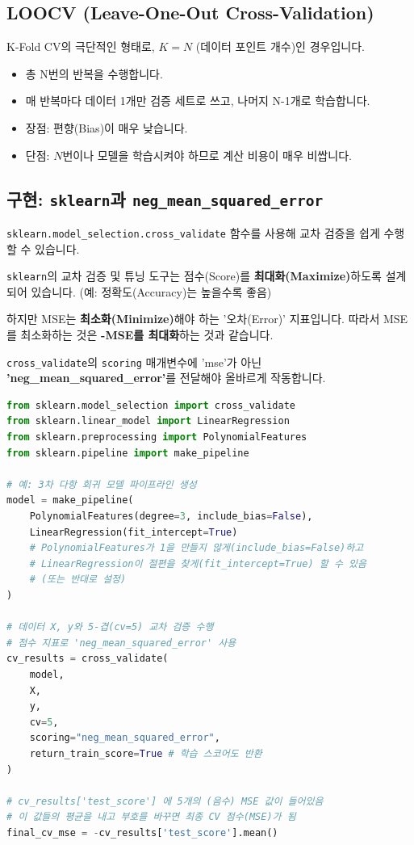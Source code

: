\documentclass[11pt,a4paper]{book}
\theoremstyle{definition}
\begin{document}
\subsection{LOOCV (Leave-One-Out Cross-Validation)}

K-Fold CV의 극단적인 형태로, $K=N$ (데이터 포인트 개수)인 경우입니다.
\begin{itemize}
    \item 총 N번의 반복을 수행합니다.
    \item 매 반복마다 데이터 1개만 검증 세트로 쓰고, 나머지 N-1개로 학습합니다.
    \item 장점: 편향(Bias)이 매우 낮습니다.
    \item 단점: $N$번이나 모델을 학습시켜야 하므로 계산 비용이 매우 비쌉니다.
\end{itemize}

\subsection{구현: \texttt{sklearn}과 \texttt{neg\_mean\_squared\_error}}

\texttt{sklearn.model\_selection.cross\_validate} 함수를 사용해 교차 검증을 쉽게 수행할 수 있습니다.

\begin{warningbox}[title=Scoring: 왜 'Negative' MSE를 쓰는가?]
\texttt{sklearn}의 교차 검증 및 튜닝 도구는 점수(Score)를 \textbf{최대화(Maximize)}하도록 설계되어 있습니다. (예: 정확도(Accuracy)는 높을수록 좋음)

하지만 MSE는 \textbf{최소화(Minimize)}해야 하는 '오차(Error)' 지표입니다.
따라서 MSE를 최소화하는 것은 \textbf{-MSE를 최대화}하는 것과 같습니다.

\texttt{cross\_validate}의 \texttt{scoring} 매개변수에 'mse'가 아닌 \textbf{'neg\_mean\_squared\_error'}를 전달해야 올바르게 작동합니다.
\end{warningbox}

\begin{lstlisting}[language=Python, caption={sklearn을 사용한 교차 검증 (의사 코드)}, label={lst:cv}, breaklines=true]
from sklearn.model_selection import cross_validate
from sklearn.linear_model import LinearRegression
from sklearn.preprocessing import PolynomialFeatures
from sklearn.pipeline import make_pipeline

# 예: 3차 다항 회귀 모델 파이프라인 생성
model = make_pipeline(
    PolynomialFeatures(degree=3, include_bias=False),
    LinearRegression(fit_intercept=True) 
    # PolynomialFeatures가 1을 만들지 않게(include_bias=False)하고
    # LinearRegression이 절편을 찾게(fit_intercept=True) 할 수 있음
    # (또는 반대로 설정)
)

# 데이터 X, y와 5-겹(cv=5) 교차 검증 수행
# 점수 지표로 'neg_mean_squared_error' 사용
cv_results = cross_validate(
    model, 
    X, 
    y, 
    cv=5, 
    scoring="neg_mean_squared_error",
    return_train_score=True # 학습 스코어도 반환
)

# cv_results['test_score'] 에 5개의 (음수) MSE 값이 들어있음
# 이 값들의 평균을 내고 부호를 바꾸면 최종 CV 점수(MSE)가 됨
final_cv_mse = -cv_results['test_score'].mean()
\end{lstlisting}
\end{document}
